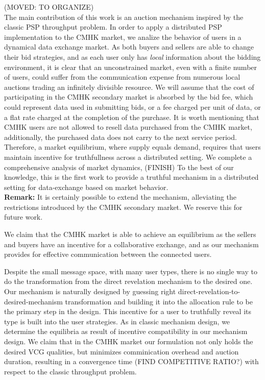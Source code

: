\documentclass[12pt]{article}
\theoremstyle{definition}
\begin{document}
\begin{multicols}{2}
(MOVED: TO ORGANIZE)\\
The main contribution of this work 
is an auction mechanism inspired by the classic PSP throughput problem. In
order to apply a distributed PSP implementation to the CMHK market,
we analize the behavior of users in a dynamical data exchange market. As both buyers and sellers are able
to change their bid strategies, and as each user only has \emph{local}
information about the bidding environment, it is clear that an unconstrained
market, even with a finite number of users, could suffer from the communication
expense from numerous local auctions trading an infinitely divisible resource.
We will assume that the cost of participating in the CMHK secondary market is
absorbed by the bid fee, which could represent data used in submitting bids, or
a fee charged per unit of data, or a flat rate charged at the completion of the
purchase. It is worth mentioning that CMHK users are not allowed to resell data
purchased from the CMHK
market, additionally, the purchased data does not carry to the next
service period. Therefore, a market equilibrium, where
supply equals demand, requires that users maintain incentive for truthfullness
across a distributed setting.
We complete a comprehensive analysis of market dynamics, (FINISH)
To the best of our knowledge, this is the first work to provide a truthful
mechanism in a distributed setting for data-exchange based on market behavior.
\\
\textbf{Remark:} It is certainly possible to extend the mechanism, alleviating the
restrictions introduced by the CMHK secondary market. We reserve this for
future work.

We claim that the CMHK market is
able to achieve an equilibrium as the sellers and buyers have an
incentive for a collaborative exchange, and as our mechanism provides
for effective communication between the connected users. 

Despite the small message space, with many user types, there is no single
way to do the transformation from the direct revelation mechanism to the
desired one. Our mechanism is naturally designed by guessing
right direct-revelation-to-desired-mechanism transformation and building it
into the allocation rule to be the primary step in the design. This incentive for a user to
truthfully reveal its type is built into the user strategies. As in classic
mechanism design, we determine the equilibria as result of incentive
compatibility in our mechanism design. 
We claim that in the CMHK market our formulation not only holds the desired VCG qualities,
but minimizes comminication overhead 
and auction duration, resulting in a convergence time (FIND COMPETITIVE RATIO?)
with respect to the classic throughput problem. 



\end{multicols}
\end{document}
